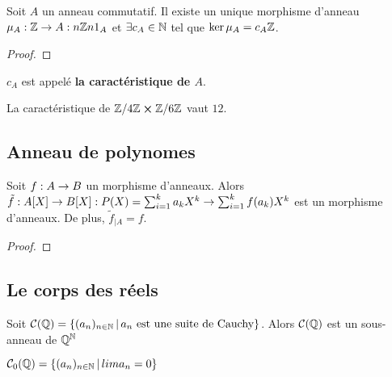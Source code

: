 \begin{proposition}
	Soit $A$ un anneau commutatif. Il existe un unique morphisme d'anneau
	$\mu_{A} : \mathbb{Z} \rightarrow A : n \mathbb{Z} n 1_{A}$ et $\exists c_{A} \in
	\mathbb{N}$ tel que $\ker{\mu_{A}} = c_{A} \mathbb{Z}$.
\end{proposition}

\ifdefined\outputproof
\begin{proof}

\end{proof}
\fi

\begin{definition}
	$c_{A}$ est appelé \textbf{la caractéristique de $A$}.
\end{definition}

\begin{exemple}
	La caractéristique de $\mathbb{Z}/4\mathbb{Z} \cross \mathbb{Z}/6\mathbb{Z}$ vaut
	$12$.
\end{exemple}

\subsection{Anneau de polynomes}

\begin{proposition}
	Soit $f : A \rightarrow B$ un morphisme d'anneaux. Alors
	$\tilde{f} : A[X] \rightarrow B[X] : P(X) = \sum_{i = 1}^{k} a_{k} X^{k}
	\rightarrow \sum_{i = 1}^{k} f(a_{k}) X^{k}$ est un morphisme d'anneaux. De
	plus, $\tilde{f}_{|A} = f$.
\end{proposition}

\ifdefined\outputproof
\begin{proof}

\end{proof}
\fi


\subsection{Le corps des réels}

\begin{proposition}
	Soit $\mathcal{C}(\mathbb{Q}) =
	\left\{(a_{n})_{n \in \mathbb{N}} \, | \, a_{n} \text{ est une suite de Cauchy} \right\}$.
	Alors $\mathcal{C}(\mathbb{Q})$ est un sous-anneau de $\mathbb{Q}^{\mathbb{N}}$
\end{proposition}

\begin{definition}
	$\mathcal{C}_{0}(\mathbb{Q}) = \left\{(a_{n})_{n \in \mathbb{N}} \, | \, lim
		a_{n} = 0 \right\}$
\end{definition}

